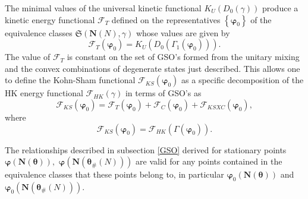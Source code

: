 \documentclass[aps,preprint]{revtex4}%
\begin{document}
The minimal values of the universal kinetic functional $K_{U}\left(
D_{0}\left(  \gamma\right)  \right)  $ produce a kinetic energy functional
$\mathcal{F}_{T}$ defined on the representatives $\left\{  \boldsymbol{\varphi
}_{0}\right\}  $ of the equivalence classes $\mathfrak{S}\left(
\boldsymbol{N}\left(  N\right)  \boldsymbol{,}\gamma\right)  $ whose values
are given by
\begin{equation}
\mathcal{F}_{T}\left(  \boldsymbol{\varphi}_{0}\right)  =K_{U}\left(
D_{0}\left(  \Gamma_{1}\left(  \boldsymbol{\varphi}_{0}\right)  \right)
\right)  . \label{KEFunc}%
\end{equation}
The value of $\mathcal{F}_{T}$ is constant on the set of GSO's formed from the
unitary mixing and the convex combinations of degenerate states just
described. This allows one to define the Kohn-Sham functional $\mathcal{F}%
_{KS}\left(  \boldsymbol{\varphi}_{0}\right)  $ as a specific decomposition of
the HK energy functional $\mathcal{F}_{HK}\left(  \gamma\right)  $ in terms of
GSO's as
\begin{equation}
\mathcal{F}_{KS}\left(  \boldsymbol{\varphi}_{0}\right)  =\mathcal{F}%
_{T}\left(  \boldsymbol{\varphi}_{0}\right)  +\mathcal{F}_{C}\left(
\boldsymbol{\varphi}_{0}\right)  +\mathcal{F}_{KSXC}\left(
\boldsymbol{\varphi}_{0}\right)  ,
\end{equation}
where
\begin{equation}
\mathcal{F}_{KS}\left(  \boldsymbol{\varphi}_{0}\right)  =\mathcal{F}%
_{HK}\left(  \Gamma\left(  \boldsymbol{\varphi}_{0}\right)  \right)  .
\end{equation}


The relationships described in subsection \ref{GSO} derived for stationary
points $\boldsymbol{\varphi}\left(  \boldsymbol{N}\left(  \boldsymbol{\theta
}\right)  \right)  ,$ $\boldsymbol{\varphi}\left(  \boldsymbol{N}\left(
\boldsymbol{\theta}_{\#}\left(  N\right)  \right)  \right)  $ are valid for
any points contained in the equivalence classes that these points belong to,
in particular $\boldsymbol{\varphi}_{0}\left(  \boldsymbol{N}\left(
\boldsymbol{\theta}\right)  \right)  $ and $\boldsymbol{\varphi}_{0}\left(
\boldsymbol{N}\left(  \boldsymbol{\theta}_{\#}\left(  N\right)  \right)
\right)  .$
\end{document}
